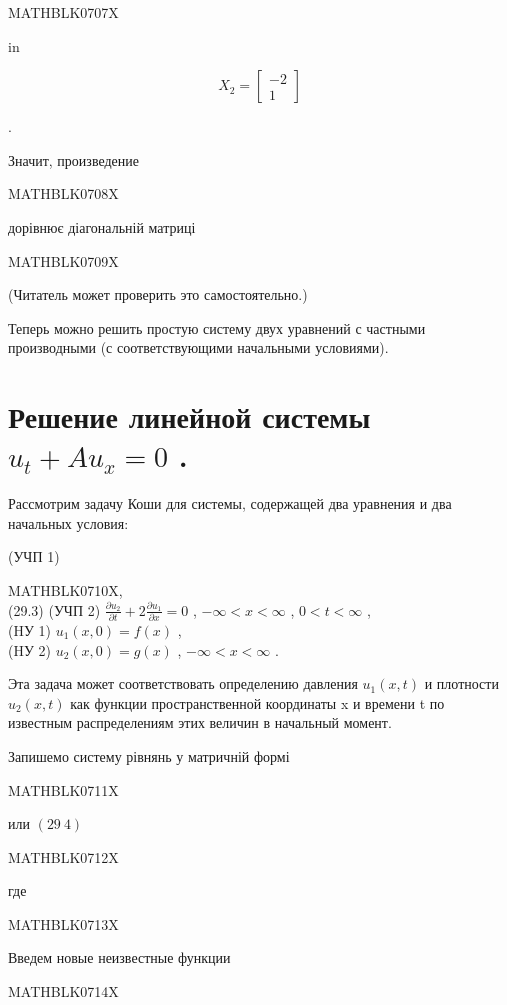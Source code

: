 \documentclass[
  ukrainian,
]{article}
\begin{document}
MATHBLK0707X

in

\[
X_2 = \begin{bmatrix} -2 \\ 1 \end{bmatrix}
\]

.

Значит, произведение

MATHBLK0708X

дорівнює діагональній матриці

MATHBLK0709X

(Читатель может проверить это самостоятельно.)

Теперь можно решить простую систему двух уравнений с частными
производными (с соответствующими начальными условиями).

\section{\texorpdfstring{Решение линейной системы \(u_t + Au_x = 0\)
.}{Решение линейной системы u\_t + Au\_x = 0 .}}\label{ux440ux435ux448ux435ux43dux438ux435-ux43bux438ux43dux435ux439ux43dux43eux439-ux441ux438ux441ux442ux435ux43cux44b-u_t-au_x-0-.}

Рассмотрим задачу Коши для системы, содержащей два уравнения и два
начальных условия:

(УЧП 1)

MATHBLK0710X,\\
(29.3) (УЧП 2)
\(\frac{\partial u_2}{\partial t} + 2 \frac{\partial u_1}{\partial x} = 0\)
, \(-\infty < x < \infty\) , \(0 < t < \infty\) ,\\
(HУ 1) \(u_1(x, 0) = f(x)\) ,\\
(HУ 2) \(u_2(x, 0) = g(x)\) , \(-\infty < x < \infty\) .

Эта задача может соответствовать определению давления \(u_1(x, t)\) и
плотности \(u_2(x, t)\) как функции пространственной координаты x и
времени t по известным распределениям этих величин в начальный момент.

Запишемо систему рівнянь у матричній формі

MATHBLK0711X

или \((29 \ 4)\)

MATHBLK0712X

где

MATHBLK0713X

Введем новые неизвестные функции

MATHBLK0714X
\end{document}
